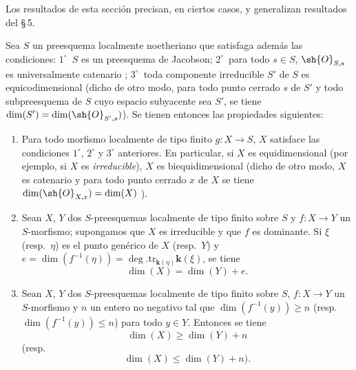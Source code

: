 Los resultados de esta sección precisan, en ciertos casos, y generalizan resultados del \S\,5.

\begin{proposition}[10.6.1]
\label{IV.10.6.1}
Sea $S$ un preesquema localmente noetheriano que satisfaga además las condiciones: $1^\circ$~$S$ es un preesquema de Jacobson; $2^\circ$~para todo $s\in S$, $\sh{O}_{S,s}$ es universalmente catenario ; $3^\circ$~toda componente irreducible $S'$ de $S$ es equicodimensional \textup{(dicho de otro modo, para todo punto cerrado $s$ de $S'$ y todo subpreesquema de $S$ cuyo espacio subyacente sea $S'$, se tiene $\dim(S')=\dim(\sh{O}_{S',s})$)}.
Se tienen entonces las propiedades siguientes:
\begin{enumerate}[label=\textup{(\roman*)}]
  \item Para todo morfismo localmente de tipo finito $g:X\to S$, $X$ satisface las condiciones $1^\circ$, $2^\circ$ y $3^\circ$ anteriores.
En particular, si $X$ es equidimensional \textup{(por ejemplo, si $X$ es \emph{irreducible})}, $X$ es biequidimensional \textup{(dicho de otro modo, $X$ es catenario y para todo punto cerrado $x$ de $X$ se tiene $\dim(\sh{O}_{X,x})=\dim(X)$ )}.
  \item Sean $X$, $Y$ dos $S$-preesquemas localmente de tipo finito sobre $S$ y $f:X\to Y$ un $S$-morfismo; supongamos que $X$ es irreducible y que $f$ es dominante.
Si $\xi$ \textup{(resp.\ $\eta$)} es el punto genérico de $X$ \textup{(resp.\ $Y$)} y $e=\dim(f^{-1}(\eta))=\deg.\mathrm{tr}_{\mathbf k(\eta)}\boldsymbol{k}(\xi)$, se tiene
\begin{equation}
\label{IV.10.6.1.1}
\tag{10.6.1.1}
\dim(X)=\dim(Y)+e.
\end{equation}
  \item Sean $X$, $Y$ dos $S$-preesquemas localmente de tipo finito sobre $S$, $f:X\to Y$ un $S$-morfismo y $n$ un entero no negativo tal que $\dim(f^{-1}(y))\geq n$ \textup{(resp.\ $\dim(f^{-1}(y))\leq n$)} para todo $y\in Y$.
Entonces se tiene
\begin{equation}
\label{IV.10.6.1.2}
\tag{10.6.1.2}
\dim(X)\geq\dim(Y)+n
\end{equation}
\textup{(resp.}
\begin{equation}
\label{IV.10.6.1.3}
\tag{10.6.1.3}
\dim(X)\leq\dim(Y)+n).
\end{equation}
\end{enumerate}
\end{proposition}

